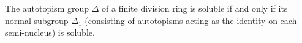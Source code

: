 The autotopism group $\Delta$ of a finite division ring is soluble if and only if its normal subgroup $\Delta_1$ (consisting of autotopisms acting as the identity on each semi-nucleus) is soluble.
